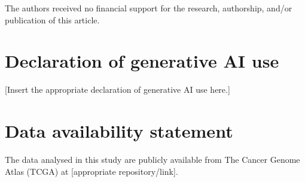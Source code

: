 \documentclass[10pt,a4paper]{article}
\begin{document}
The authors received no financial support for the research,
authorship, and/or publication of this article.

\section*{Declaration of generative AI use}

[Insert the appropriate declaration of generative AI use here.]

\section*{Data availability statement}

The data analysed in this study are publicly available from
The Cancer Genome Atlas (TCGA) at [appropriate repository/link].



\vspace{1em}


\end{document}
